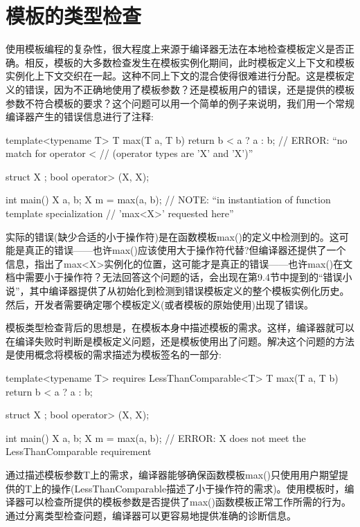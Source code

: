 \section{模板的类型检查}

使用模板编程的复杂性，很大程度上来源于编译器无法在本地检查模板定义是否正确。相反，模板的大多数检查发生在模板实例化期间，此时模板定义上下文和模板实例化上下文交织在一起。这种不同上下文的混合使得很难进行分配。这是模板定义的错误，因为不正确地使用了模板参数？还是模板用户的错误，还是提供的模板参数不符合模板的要求？这个问题可以用一个简单的例子来说明，我们用一个常规编译器产生的错误信息进行了注释:

\begin{cpp}
template<typename T>
T max(T a, T b)
{
	return b < a ? a : b; // ERROR: “no match for operator <
	// (operator types are ’X’ and ’X’)”
}

struct X {
};
bool operator> (X, X);

int main()
{
	X a, b;
	X m = max(a, b); // NOTE: “in instantiation of function template specialization
					// ’max<X>’ requested here”
}
\end{cpp}

实际的错误(缺少合适的小于操作符)是在函数模板max()的定义中检测到的。这可能是真正的错误——也许max()应该使用大于操作符代替?但编译器还提供了一个信息，指出了max<X>实例化的位置，这可能才是真正的错误——也许max()在文档中需要小于操作符？无法回答这个问题的话，会出现在第9.4节中提到的“错误小说”，其中编译器提供了从初始化到检测到错误模板定义的整个模板实例化历史。然后，开发者需要确定哪个模板定义(或者模板的原始使用)出现了错误。

模板类型检查背后的思想是，在模板本身中描述模板的需求。这样，编译器就可以在编译失败时判断是模板定义问题，还是模板使用出了问题。解决这个问题的方法是使用概念将模板的需求描述为模板签名的一部分:

\begin{cpp}
template<typename T> requires LessThanComparable<T>
T max(T a, T b)
{
	return b < a ? a : b;
}

struct X { };
bool operator> (X, X);

int main()
{
	X a, b;
	X m = max(a, b); // ERROR: X does not meet the LessThanComparable requirement
}
\end{cpp}

通过描述模板参数T上的需求，编译器能够确保函数模板max()只使用用户期望提供的T上的操作(LessThanComparable描述了小于操作符的需求)。使用模板时，编译器可以检查所提供的模板参数是否提供了max()函数模板正常工作所需的行为。通过分离类型检查问题，编译器可以更容易地提供准确的诊断信息。

